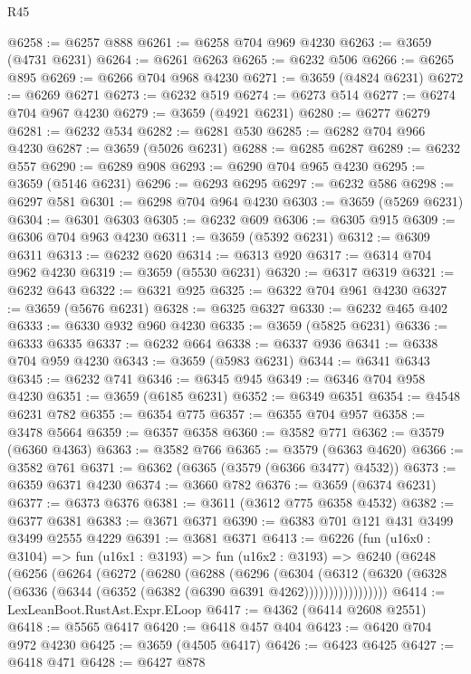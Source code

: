\begin{lexlean}{R45}
\begin{coremodule}
@6258 := @6257 @888
@6261 := @6258 @704 @969 @4230
@6263 := @3659 (@4731 @6231)
@6264 := @6261 @6263
@6265 := @6232 @506
@6266 := @6265 @895
@6269 := @6266 @704 @968 @4230
@6271 := @3659 (@4824 @6231)
@6272 := @6269 @6271
@6273 := @6232 @519
@6274 := @6273 @514
@6277 := @6274 @704 @967 @4230
@6279 := @3659 (@4921 @6231)
@6280 := @6277 @6279
@6281 := @6232 @534
@6282 := @6281 @530
@6285 := @6282 @704 @966 @4230
@6287 := @3659 (@5026 @6231)
@6288 := @6285 @6287
@6289 := @6232 @557
@6290 := @6289 @908
@6293 := @6290 @704 @965 @4230
@6295 := @3659 (@5146 @6231)
@6296 := @6293 @6295
@6297 := @6232 @586
@6298 := @6297 @581
@6301 := @6298 @704 @964 @4230
@6303 := @3659 (@5269 @6231)
@6304 := @6301 @6303
@6305 := @6232 @609
@6306 := @6305 @915
@6309 := @6306 @704 @963 @4230
@6311 := @3659 (@5392 @6231)
@6312 := @6309 @6311
@6313 := @6232 @620
@6314 := @6313 @920
@6317 := @6314 @704 @962 @4230
@6319 := @3659 (@5530 @6231)
@6320 := @6317 @6319
@6321 := @6232 @643
@6322 := @6321 @925
@6325 := @6322 @704 @961 @4230
@6327 := @3659 (@5676 @6231)
@6328 := @6325 @6327
@6330 := @6232 @465 @402
@6333 := @6330 @932 @960 @4230
@6335 := @3659 (@5825 @6231)
@6336 := @6333 @6335
@6337 := @6232 @664
@6338 := @6337 @936
@6341 := @6338 @704 @959 @4230
@6343 := @3659 (@5983 @6231)
@6344 := @6341 @6343
@6345 := @6232 @741
@6346 := @6345 @945
@6349 := @6346 @704 @958 @4230
@6351 := @3659 (@6185 @6231)
@6352 := @6349 @6351
@6354 := @4548 @6231 @782
@6355 := @6354 @775
@6357 := @6355 @704 @957
@6358 := @3478 @5664
@6359 := @6357 @6358
@6360 := @3582 @771
@6362 := @3579 (@6360 @4363)
@6363 := @3582 @766
@6365 := @3579 (@6363 @4620)
@6366 := @3582 @761
@6371 := @6362 (@6365 (@3579 (@6366 @3477) @4532))
@6373 := @6359 @6371 @4230
@6374 := @3660 @782
@6376 := @3659 (@6374 @6231)
@6377 := @6373 @6376
@6381 := @3611 (@3612 @775 @6358 @4532)
@6382 := @6377 @6381
@6383 := @3671 @6371
@6390 := @6383 @701 @121 @431 @3499 @3499 @2555 @4229
@6391 := @3681 @6371
@6413 := @6226
    (fun (u16x0 : @3104) =>
    fun (u16x1 : @3193) =>
    fun (u16x2 : @3193) =>
    @6240
      (@6248
        (@6256
          (@6264
            (@6272
              (@6280
                (@6288
                  (@6296
                    (@6304
                      (@6312
                        (@6320
                          (@6328 (@6336 (@6344 (@6352 (@6382 (@6390 @6391 @4262)))))))))))))))))
@6414 := LexLeanBoot.RustAst.Expr.ELoop
@6417 := @4362 (@6414 @2608 @2551)
@6418 := @5565 @6417
@6420 := @6418 @457 @404
@6423 := @6420 @704 @972 @4230
@6425 := @3659 (@4505 @6417)
@6426 := @6423 @6425
@6427 := @6418 @471
@6428 := @6427 @878

\end{coremodule}
\end{lexlean}
